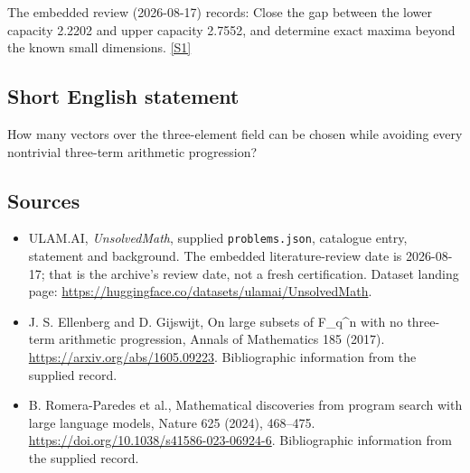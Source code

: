 \documentclass[11pt,a4paper]{article}
\newcommand{\sref}[2]{\hyperlink{source:#1:#2}{[S#2]}}
\begin{document}
The embedded review (2026-08-17) records: Close the gap between the lower capacity 2.2202 and upper capacity 2.7552, and determine exact maxima beyond the known small dimensions. \sref{statement}{1}

\subsection{Short English statement}

How many vectors over the three-element field can be chosen while avoiding every nontrivial three-term arithmetic progression?

\subsection{Sources}

{\small

\begin{itemize}

\item[\hypertarget{source:statement:1}{S1}] ULAM.AI, \emph{UnsolvedMath}, supplied \texttt{problems.json}, catalogue entry, statement and background. The embedded literature-review date is 2026-08-17; that is the archive’s review date, not a fresh certification. Dataset landing page: \url{https://huggingface.co/datasets/ulamai/UnsolvedMath}.

\item[\hypertarget{source:statement:2}{S2}] J. S. Ellenberg and D. Gijswijt, On large subsets of F\_q\textasciicircum{}n with no three-term arithmetic progression, Annals of Mathematics 185 (2017). \url{https://arxiv.org/abs/1605.09223}. Bibliographic information from the supplied record.

\item[\hypertarget{source:statement:3}{S3}] B. Romera-Paredes et al., Mathematical discoveries from program search with large language models, Nature 625 (2024), 468–475. \url{https://doi.org/10.1038/s41586-023-06924-6}. Bibliographic information from the supplied record.

\end{itemize}

}

\label{end:statement}
\end{document}
